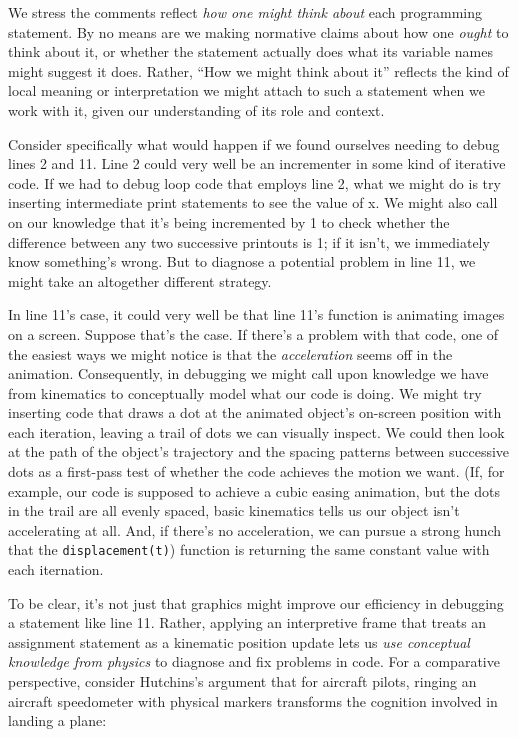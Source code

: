 We stress the comments reflect \emph{how one might think about}
each programming statement. By no means are we making normative
claims about how one \emph{ought} to think about it, or whether the
statement actually does what its variable names might suggest it does. Rather,
``How we might think about it'' reflects the kind of local meaning or
interpretation we might attach to such a statement when we work with it,
given our understanding of its role and context.

Consider specifically what would happen if we found ourselves needing to debug lines 2 and 11. Line 2 could very well be
an incrementer in some kind of iterative code. If we had to debug loop code
that employs line 2, what we might do is try inserting
intermediate print statements to see the value of x. We might also call on our knowledge that it's being incremented by 1 to check whether the difference between any two successive printouts is 1; if it isn't, we immediately know something's wrong. But to diagnose a potential problem in line 11, we might take an altogether different strategy.


In line
11's case, it could very well be that line 11's function is animating
images on a screen. Suppose that's the case. If there's a problem with that code, one of the
easiest ways we might notice is that the \emph{acceleration} seems off in the
animation. Consequently, in debugging we might call upon knowledge we have
from kinematics to conceptually model what our code is doing. We might try inserting code that draws a dot at the
animated object's on-screen position with each iteration, leaving a trail of dots we can
visually inspect. We could then look at the path of the object's
trajectory and the spacing patterns between successive dots as a
first-pass test of whether the code achieves the motion we want. (If, for example, our code is supposed to achieve a cubic easing animation, but the dots in the trail are all evenly spaced, basic kinematics tells us our object isn't accelerating at all. And, if there's no acceleration, we can pursue a strong hunch that the \texttt{displacement(t)}) function is returning the same constant value with each iternation.

To be clear, it's not just that graphics might improve our efficiency in
debugging a statement like line 11. Rather, applying an interpretive frame that
treats an assignment statement as a kinematic position update lets us
\emph{use conceptual knowledge from physics} to diagnose and fix
problems in code. For a comparative perspective, consider Hutchins's argument that for aircraft pilots, ringing an aircraft speedometer with physical markers transforms the cognition involved in landing a plane:

